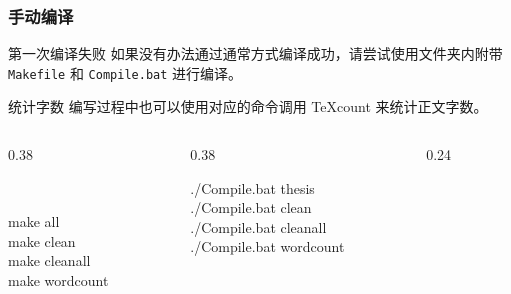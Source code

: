 \begin{frame}

  \frametitle{手动编译}

  \alert{第一次编译失败} 如果没有办法通过通常方式编译成功，请尝试使用文件夹内附带 \faLinux{}\,\faApple{} \texttt{Makefile} 和 \faWindows{} \texttt{Compile.bat} 进行编译。

  \alert{统计字数} 编写过程中也可以使用对应的命令调用 \TeX{}count 来统计正文字数。

  \begin{columns}

    \begin{column}{0.38\textwidth}

      \begin{exampleblock}{\faLinux{}\,\faApple}

        \ttfamily

        make all\\

        make clean\\

        make cleanall\\

        make wordcount

      \end{exampleblock}

    \end{column}

    \begin{column}{0.38\textwidth}

      \begin{exampleblock}{\faWindows}

        \ttfamily

        ./Compile.bat thesis\\

        ./Compile.bat clean\\

        ./Compile.bat cleanall\\

        ./Compile.bat wordcount

      \end{exampleblock}

    \end{column}

    \begin{column}{0.24\textwidth}

      \begin{block}{\faInfo}


\end{block}
\end{column}
\end{columns}
\end{frame}
